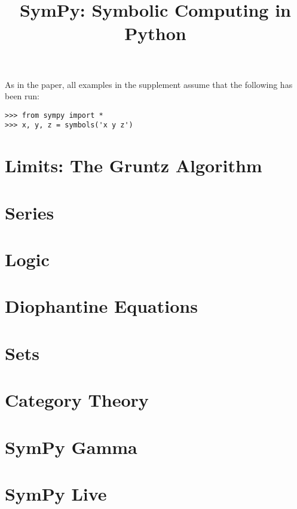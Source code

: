 \documentclass[supplement]{siamart0216}
\title{SymPy: Symbolic Computing in Python}
\begin{document}
\maketitle

As in the paper, all examples in the supplement assume that the following
has been run:
\begin{verbatim}
>>> from sympy import *
>>> x, y, z = symbols('x y z')
\end{verbatim}

\section{Limits: The Gruntz Algorithm}



\section{Series}



\section{Logic}



\section{Diophantine Equations}



\section{Sets}


\section{Category Theory}


\section{SymPy Gamma}\label{sympy-gamma}



\section{SymPy Live}\label{sympy-live}
\end{document}
